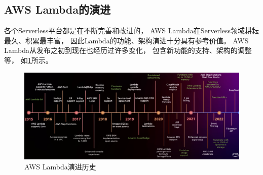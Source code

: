 \subsection{AWS Lambda的演进}
各个Serverless平台都是在不断完善和改进的，
AWS Lambda在Serverless领域耕耘最久、积累最丰富，
因此Lambda的功能、架构演进十分具有参考价值。
AWS Lambda从发布之初到现在也经历过许多变化，
包含新功能的支持、架构的调整等，
如\cref{lambda_involution}所示。

\begin{figure}[ht!]
    \centering
    \includegraphics[width=\linewidth]{images/lambda_involution.png}
    \caption{AWS Lambda演进历史\cite{aws_lambda_2022}}
    \label{lambda_involution}
\end{figure}
